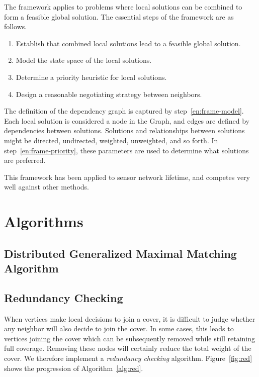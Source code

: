 \documentclass[technote, 10pt, letter]{IEEEtran}
\begin{document}
The framework applies to problems where local solutions can be combined to form a feasible global solution. The essential steps of the framework are as follows. 
\begin{enumerate}
\item Establish that combined local solutions lead to a feasible global solution.
\item Model the state space of the local solutions. \label{en:frame-model}
\item Determine a priority heuristic for local solutions.\label{en:frame-priority}
\item Design a reasonable negotiating strategy between neighbors.
\end{enumerate} 

The definition of the dependency graph is captured by step~\ref{en:frame-model}. Each local solution is considered a node in the Graph, and edges are defined by dependencies between solutions. Solutions and relationships between solutions might be directed, undirected, weighted, unweighted, and so forth. In step~\ref{en:frame-priority}, these parameters are used to determine what solutions are preferred. 

This framework has been applied to sensor network lifetime, and competes very well against other methods\cite{Dhawan:hipc-09}.

\section{Algorithms}
\label{sec:algorithms}

\subsection{Distributed Generalized Maximal Matching Algorithm}

\subsection{Redundancy Checking}
\label{sec:redundant}
When vertices make local decisions to join a cover, it is difficult to judge whether any neighbor will also decide to join the cover. In some cases, this leads to vertices joining the cover which can be subsequently removed while still retaining full coverage. Removing these nodes will certainly reduce the total weight of the cover. We therefore implement a {\em redundancy checking} algorithm. Figure~\ref{fig:red} shows the progression of Algorithm~\ref{alg:red}.
\end{document}
